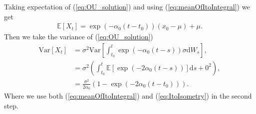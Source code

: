 Taking expectation of (\ref{eq:OU_solution}) and using (\ref{eq:meanOfItoIntegral}) we get
\begin{align}
    \mathbb{E}\left[X_t\right] = \exp\left(-\alpha_0\left(t - t_0\right)\right)\left(x_0 - \mu\right) + \mu. \label{eq:OU_mean}
\end{align}
Then we take the variance of (\ref{eq:OU_solution})
\begin{align}
    \mathrm{Var}\left[X_t\right] &= \sigma^2\mathrm{Var}\left[\int_{t_0}^t \exp\left(-\alpha_0 \left(t - s\right)\right)\sigma \mathrm{d}W_s\right],\nonumber \\
    & = \sigma^2\left(\int_{t_0}^t \mathbb{E}\left[\exp\left(-2\alpha_0\left(t - s\right)\right)\right] \mathrm{d}s + 0^2 \right), \nonumber \\
    & = \frac{\sigma^2}{2\alpha_0}\left(1 - \exp\left(-2\alpha_0(t - t_0)\right)\right). \label{eq:OU_variance}
\end{align}
Where we use both (\ref{eq:meanOfItoIntegral}) and (\ref{eq:ItoIsometry}) in the second step.
